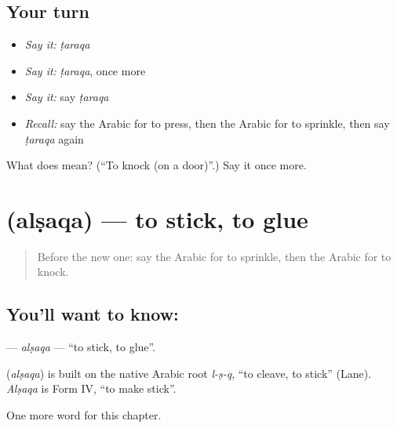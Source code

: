 \subsection*{Your turn}
\begin{itemize}
\raggedright
  \item \emph{Say it:} \emph{ṭaraqa}
  \item \emph{Say it:} \emph{ṭaraqa}, once more
  \item \emph{Say it:} say \emph{ṭaraqa}
  \item \emph{Recall:} say the Arabic for to press, then the Arabic for to sprinkle, then say \emph{ṭaraqa} again
\end{itemize}

\begin{tcolorbox}[breakable,colback=teal!4,colframe=teal!35!black,title={Before you move on}]
What does  mean? (\textquotedblleft{}To knock (on a door)\textquotedblright{}.) Say it once more.
\end{tcolorbox}
\section[\texorpdfstring{\ar{ألصق} (alṣaqa)}{ألصق (alṣaqa)}]{ (alṣaqa) — to stick, to glue}

\label{lesson:AR-C260-alsaqa}



\begin{quote}
Before the new one: say the Arabic for to sprinkle, then the Arabic for to knock.
\end{quote}

\subsection*{You'll want to know: }
\textbf{} — \emph{alṣaqa} — \textquotedblleft{}to stick, to glue\textquotedblright{}.

\begin{cousinweb}
\textbf{} (\emph{alṣaqa}) is built on the native Arabic root \emph{l-ṣ-q}, \textquotedblleft{}to cleave, to stick\textquotedblright{} (Lane). \emph{Alṣaqa} is Form IV, \textquotedblleft{}to make stick\textquotedblright{}.
\end{cousinweb}

\begin{grammarlens}[title={What you've built}]
One more word for this chapter.
\end{grammarlens}

